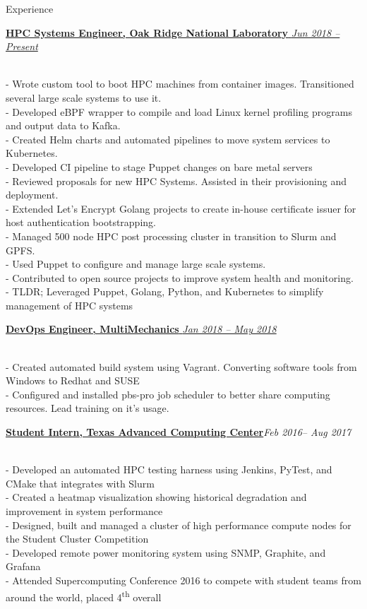 \documentclass{resume} %
\begin{document}
\begin{rSection}{Experience}

\href{http://olcf.ornl.gov}
{\textbf{HPC Systems Engineer, Oak Ridge National Laboratory}
  \hfill {\em Jun 2018 -- Present}}
  
\\- Wrote custom tool to boot HPC machines from container images. Transitioned
    several large scale systems to use it.
\\- Developed eBPF wrapper to compile and load Linux kernel profiling programs and
    output data to Kafka.
\\- Created Helm charts and automated pipelines to move system services to
    Kubernetes.
\\- Developed CI pipeline to stage Puppet changes on bare metal servers
\\- Reviewed proposals for new HPC Systems. Assisted in their provisioning and
    deployment.
\\- Extended Let's Encrypt Golang projects to create in-house certificate issuer for
    host authentication bootstrapping.
\\- Managed 500 node HPC post processing cluster in transition to Slurm and GPFS.
\\- Used Puppet to configure and manage large scale systems.
\\- Contributed to open source projects to improve system health and monitoring.
\\- TLDR; Leveraged Puppet, Golang, Python, and Kubernetes to
    simplify management of HPC systems

\href{http://multimechanics.com}
{\textbf{DevOps Engineer, MultiMechanics}
  \hfill
  { \em Jan 2018 -- May 2018 }}
  
\\- Created automated build system using Vagrant. Converting software tools from
    Windows to Redhat and SUSE
\\- Configured and installed pbs-pro job scheduler to better share computing
    resources. Lead training on it's usage.

\href{http://tacc.utexas.edu}
{\textbf{Student Intern, Texas Advanced Computing Center}}\hfill{\em Feb 2016-- Aug 2017}

\\- Developed an automated HPC testing harness using Jenkins, PyTest, and CMake that
    integrates with Slurm
\\- Created a heatmap visualization showing historical degradation and improvement in system performance
\\- Designed, built and managed a cluster of high performance compute nodes for the Student
    Cluster Competition
\\- Developed remote power monitoring system using SNMP, Graphite, and Grafana
\\- Attended Supercomputing Conference 2016 to compete with student teams from around the
    world, placed 4\textsuperscript{th} overall


\end{rSection}
\end{document}
